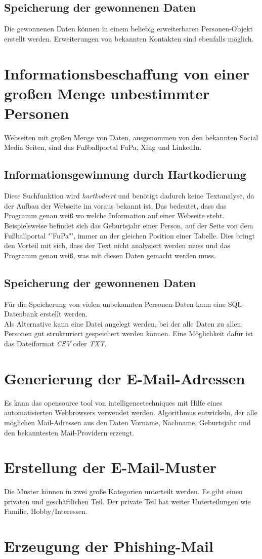 	\subsection{Speicherung der gewonnenen Daten}
	Die gewonnenen Daten können in einem beliebig erweiterbaren Personen-Objekt erstellt werden. Erweiterungen von bekannten Kontakten sind ebenfalls möglich.
	
\section{Informationsbeschaffung von einer großen Menge unbestimmter Personen}
Webseiten mit großen Menge von Daten, ausgenommen von den bekannten Social Media Seiten, sind das Fußballportal FuPa, Xing und LinkedIn.
	\subsection{Informationsgewinnung durch Hartkodierung}
	Diese Suchfunktion wird \textit{hartkodiert} und benötigt dadurch keine Textanalyse, da der Aufbau der Webseite im voraus bekannt ist. Das bedeutet, dass das Programm genau weiß wo welche Information auf einer Webseite steht. Beispielsweise befindet sich das Geburtsjahr einer Person, auf der Seite von dem Fußballportal "'FuPa"', immer an der gleichen Position einer Tabelle. Dies bringt den Vorteil mit sich, dass der Text nicht analysiert werden muss und das Programm genau weiß, was mit diesen Daten gemacht werden muss.
	\subsection{Speicherung der gewonnenen Daten}
	Für die Speicherung von vielen unbekannten Personen-Daten kann eine SQL-Datenbank erstellt werden.\\
	Als Alternative kann eine Datei angelegt werden, bei der alle Daten zu allen Personen gut strukturiert gespeichert werden können. Eine Möglichkeit dafür ist das Dateiformat \textit{CSV} oder \textit{TXT}.%

\section{Generierung der E-Mail-Adressen}
Es kann das opensource tool von intelligencetechniques mit Hilfe eines automatisierten Webbrowsers verwendet werden. Algorithmus entwickeln, der alle möglichen Mail-Adressen aus den Daten Vorname, Nachname, Geburtsjahr und den bekanntesten Mail-Providern erzeugt.

\section{Erstellung der E-Mail-Muster}
Die Muster können in zwei große Kategorien unterteilt werden. Es gibt einen privaten und geschäftlichen Teil. Der private Teil hat weiter Unterteilungen wie Familie, Hobby/Interessen.
\section{Erzeugung der Phishing-Mail}
